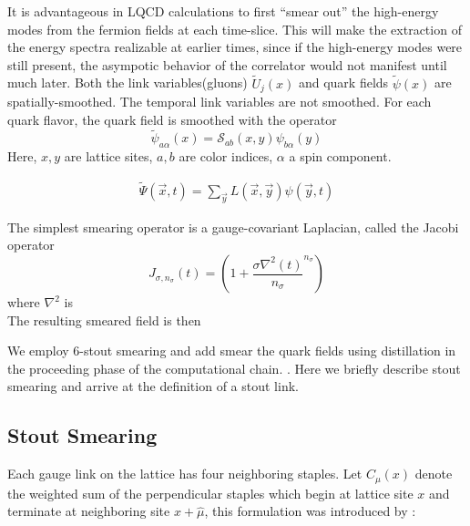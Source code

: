 It is advantageous in LQCD calculations to first ``smear out'' the high-energy modes from the fermion fields at each time-slice. This will make the extraction of the energy spectra realizable at earlier times, since if the high-energy modes were still present, the asympotic behavior of the correlator would not manifest until much later. 
Both the link variables(gluons) $\tilde{U}_j(x)$ and quark fields $\tilde{\psi}(x)$ are spatially-smoothed. The temporal link variables are not smoothed. For each quark flavor, the quark field is smoothed with the operator
\begin{equation}
    \tilde{\psi}_{a\alpha}(x) = \mathcal{S}_{ab}(x,y) \psi_{b\alpha}(y)
\end{equation}
Here, $x,y$ are lattice sites, $a,b$ are color indices, $\alpha$ a spin component. 

\begin{align}
    \tilde{\Psi}(\vec{x},t) = \sum_{\vec{y}} L(\vec{x},\vec{y})\psi(\vec{y},t)
\end{align}

The simplest smearing operator is a gauge-covariant Laplacian, called the Jacobi operator \cite{peardon_novel_2009} 
\begin{equation}
    J_{\sigma,n_\sigma}(t) = \left(1 + \frac{\sigma\nabla^2(t)}{n_\sigma}^{n_\sigma}\right)
\end{equation} where $\nabla^2$ is 
\begin{equation}
    
\end{equation}
The resulting smeared field is then 
\begin{equation}
    
\end{equation}

We employ 6-stout smearing \cite{stout} and add smear the quark fields using distillation in the proceeding phase of the computational chain. \cite{peardon_novel_2009}. Here we briefly describe stout smearing and arrive at the definition of a stout link. 

\subsection{Stout Smearing}
Each gauge link on the lattice has four neighboring staples. 
Let $C_\mu(x)$ denote the weighted sum of the perpendicular staples which
begin at lattice site $x$ and terminate at neighboring site 
$x\!+\!\hat{\mu}$, this formulation was introduced by \cite{stout}:

